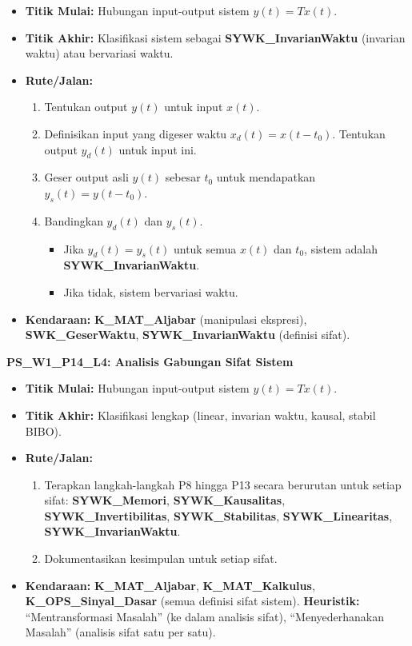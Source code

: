 \documentclass[
  letterpaper,
  DIV=11,
  numbers=noendperiod]{scrreprt}
\providecommand{\tightlist}{%
  \setlength{\itemsep}{0pt}\setlength{\parskip}{0pt}}\usepackage{longtable,booktabs,array}
\begin{document}
\begin{itemize}
\tightlist
\item
  \textbf{Titik Mulai:} Hubungan input-output sistem \(y(t) = T{x(t)}\).
\item
  \textbf{Titik Akhir:} Klasifikasi sistem sebagai
  \textbf{SYWK\_InvarianWaktu} (invarian waktu) atau bervariasi waktu.
\item
  \textbf{Rute/Jalan:}

  \begin{enumerate}
  \def\labelenumi{\arabic{enumi}.}
  \tightlist
  \item
    Tentukan output \(y(t)\) untuk input \(x(t)\).
  \item
    Definisikan input yang digeser waktu \(x_d(t) = x(t-t_0)\). Tentukan
    output \(y_d(t)\) untuk input ini.
  \item
    Geser output asli \(y(t)\) sebesar \(t_0\) untuk mendapatkan
    \(y_s(t) = y(t-t_0)\).
  \item
    Bandingkan \(y_d(t)\) dan \(y_s(t)\).

    \begin{itemize}
    \tightlist
    \item
      Jika \(y_d(t) = y_s(t)\) untuk semua \(x(t)\) dan \(t_0\), sistem
      adalah \textbf{SYWK\_InvarianWaktu}.
    \item
      Jika tidak, sistem bervariasi waktu.
    \end{itemize}
  \end{enumerate}
\item
  \textbf{Kendaraan:} \textbf{K\_MAT\_Aljabar} (manipulasi ekspresi),
  \textbf{SWK\_GeserWaktu}, \textbf{SYWK\_InvarianWaktu} (definisi
  sifat).
\end{itemize}

\textbf{PS\_W1\_P14\_L4: Analisis Gabungan Sifat Sistem}

\begin{itemize}
\tightlist
\item
  \textbf{Titik Mulai:} Hubungan input-output sistem \(y(t) = T{x(t)}\).
\item
  \textbf{Titik Akhir:} Klasifikasi lengkap (linear, invarian waktu,
  kausal, stabil BIBO).
\item
  \textbf{Rute/Jalan:}

  \begin{enumerate}
  \def\labelenumi{\arabic{enumi}.}
  \tightlist
  \item
    Terapkan langkah-langkah P8 hingga P13 secara berurutan untuk setiap
    sifat: \textbf{SYWK\_Memori}, \textbf{SYWK\_Kausalitas},
    \textbf{SYWK\_Invertibilitas}, \textbf{SYWK\_Stabilitas},
    \textbf{SYWK\_Linearitas}, \textbf{SYWK\_InvarianWaktu}.
  \item
    Dokumentasikan kesimpulan untuk setiap sifat.
  \end{enumerate}
\item
  \textbf{Kendaraan:} \textbf{K\_MAT\_Aljabar},
  \textbf{K\_MAT\_Kalkulus}, \textbf{K\_OPS\_Sinyal\_Dasar} (semua
  definisi sifat sistem). \textbf{Heuristik:} ``Mentransformasi
  Masalah'' (ke dalam analisis sifat), ``Menyederhanakan Masalah''
  (analisis sifat satu per satu).
\end{itemize}
\end{document}
